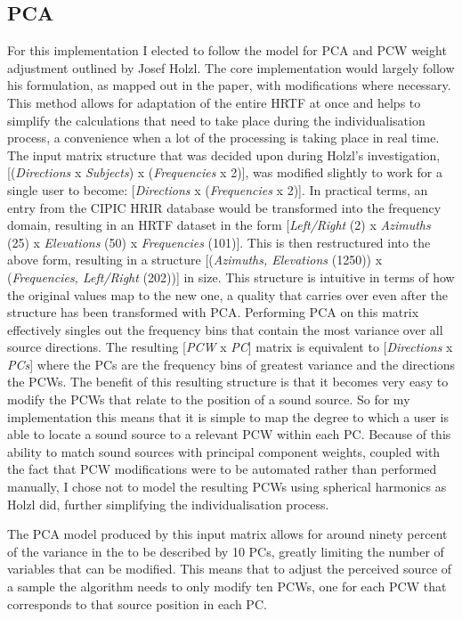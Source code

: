 \subsection{PCA}
For this implementation I elected to follow the model for PCA and PCW weight adjustment outlined by Josef Holzl\citep{Holzl2014a}. The core implementation would largely follow his formulation, as mapped out in the paper, with modifications where necessary. This method allows for adaptation of the entire HRTF at once and helps to simplify the calculations that need to take place during the individualisation process, a convenience when a lot of the processing is taking place in real time. The input matrix structure that was decided upon during Holzl's investigation, [(\textit{Directions} x \textit{Subjects}) x (\textit{Frequencies} x 2)], was modified slightly to work for a single user to become: [\textit{Directions} x (\textit{Frequencies} x 2)]. In practical terms, an entry from the CIPIC HRIR database would be transformed into the frequency domain, resulting in an HRTF dataset in the form [\textit{Left/Right} (2) x \textit{Azimuths} (25) x \textit{Elevations} (50) x \textit{Frequencies} (101)]. This is then restructured into the above form, resulting in a structure [(\textit{Azimuths, Elevations} (1250)) x (\textit{Frequencies, Left/Right} (202))] in size. This structure is intuitive in terms of how the original values map to the new one, a quality that carries over even after the structure has been transformed with PCA. Performing PCA on this matrix effectively singles out the frequency bins that contain the most variance over all source directions. The resulting [\textit{PCW} x \textit{PC}] matrix is equivalent to [\textit{Directions} x \textit{PCs}] where the PCs are the frequency bins of greatest variance and the directions the PCWs. The benefit of this resulting structure is that it becomes very easy to modify the PCWs that relate to the position of a sound source. So for my implementation this means that it is simple to map the degree to which a user is able to locate a sound source to a relevant PCW within each PC. Because of this ability to match sound sources with principal component weights, coupled with the fact that PCW modifications were to be automated rather than performed manually, I chose not to model the resulting PCWs using spherical harmonics as Holzl did, further simplifying the individualisation process. 

The PCA model produced by this input matrix allows for around ninety percent of the variance in the to be described by 10 PCs, greatly limiting the number of variables that can be modified. This means that to adjust the perceived source of a sample the algorithm needs to only modify ten PCWs, one for each PCW that corresponds to that source position in each PC. 

